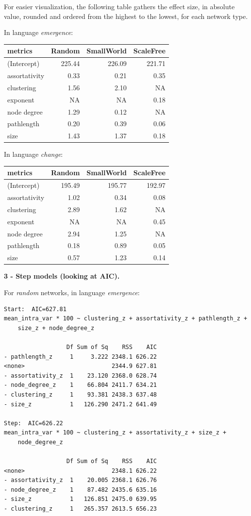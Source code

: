 \documentclass[
]{article}
\begin{document}
For easier visualization, the following table gathers the effect size,
in absolute value, rounded and ordered from the highest to the lowest,
for each network type.

In language \emph{emergence}:

\begin{longtable}[]{@{}lrrr@{}}
\toprule()
metrics & Random & SmallWorld & ScaleFree \\
\midrule()
\endhead
(Intercept) & 225.44 & 226.09 & 221.71 \\
assortativity & 0.33 & 0.21 & 0.35 \\
clustering & 1.56 & 2.10 & NA \\
exponent & NA & NA & 0.18 \\
node degree & 1.29 & 0.12 & NA \\
pathlength & 0.20 & 0.39 & 0.06 \\
size & 1.43 & 1.37 & 0.18 \\
\bottomrule()
\end{longtable}

In language \emph{change}:

\begin{longtable}[]{@{}lrrr@{}}
\toprule()
metrics & Random & SmallWorld & ScaleFree \\
\midrule()
\endhead
(Intercept) & 195.49 & 195.77 & 192.97 \\
assortativity & 1.02 & 0.34 & 0.08 \\
clustering & 2.89 & 1.62 & NA \\
exponent & NA & NA & 0.45 \\
node degree & 2.94 & 1.25 & NA \\
pathlength & 0.18 & 0.89 & 0.05 \\
size & 0.57 & 1.23 & 0.14 \\
\bottomrule()
\end{longtable}

\textbf{3 - Step models (looking at AIC).}

For \emph{random} networks, in language \emph{emergence}:

\begin{verbatim}
Start:  AIC=627.81
mean_intra_var * 100 ~ clustering_z + assortativity_z + pathlength_z + 
    size_z + node_degree_z

                  Df Sum of Sq    RSS    AIC
- pathlength_z     1     3.222 2348.1 626.22
<none>                         2344.9 627.81
- assortativity_z  1    23.120 2368.0 628.74
- node_degree_z    1    66.804 2411.7 634.21
- clustering_z     1    93.381 2438.3 637.48
- size_z           1   126.290 2471.2 641.49

Step:  AIC=626.22
mean_intra_var * 100 ~ clustering_z + assortativity_z + size_z + 
    node_degree_z

                  Df Sum of Sq    RSS    AIC
<none>                         2348.1 626.22
- assortativity_z  1    20.005 2368.1 626.76
- node_degree_z    1    87.482 2435.6 635.16
- size_z           1   126.851 2475.0 639.95
- clustering_z     1   265.357 2613.5 656.23
\end{verbatim}
\end{document}
